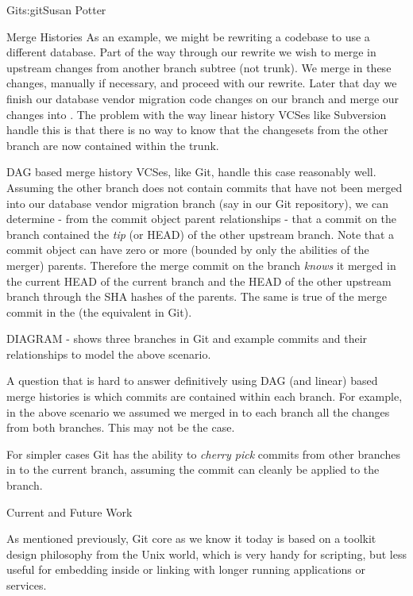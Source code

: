 \begin{aosachapter}{Git}{s:git}{Susan Potter}
\begin{aosasect1}{Merge Histories}
As an example,
we might be rewriting a codebase to use a different database. Part of the
way through our rewrite we wish to merge in upstream changes from another
branch subtree (not trunk). We merge in these changes, manually if necessary,
and proceed with our rewrite. Later that day we finish our database vendor
migration code changes on our  branch and merge
our changes into . The problem with the way linear history VCSes
like Subversion handle this is that there is no way to know that the
changesets from the other branch are now contained within the trunk.

DAG based merge history VCSes, like Git, handle this case reasonably well.
Assuming the other branch does not contain commits that have not been merged
into our database vendor migration branch (say  in our
Git repository), we can determine - from the commit object parent
relationships - that a commit on the  branch contained
the \emph{tip} (or HEAD) of the other upstream branch. Note that a commit
object can have zero or more (bounded by only the abilities of the merger)
parents. Therefore the merge commit on the  branch
\emph{knows} it merged in the current HEAD of the current branch and the
HEAD of the other upstream branch through the SHA hashes of the parents.
The same is true of the merge commit in the  (the 
equivalent in Git).

DIAGRAM - shows three branches in Git and example commits and their
relationships to model the above scenario.

A question that is hard to answer definitively using DAG (and linear) based
merge histories is which commits are contained within each branch. For
example, in the above scenario we assumed we merged in to each branch all
the changes from both branches. This may not be the case.

For simpler cases Git has the ability to \emph{cherry pick} commits from
other branches in to the current branch, assuming the commit can cleanly
be applied to the branch.

\end{aosasect1}

\begin{aosasect1}{Current and Future Work}

As mentioned previously, Git core as we know it today is based on a toolkit
design philosophy from the Unix world, which is very handy for scripting,
but less useful for embedding inside or linking with longer running
applications or services.


\end{aosasect1}
\end{aosachapter}
